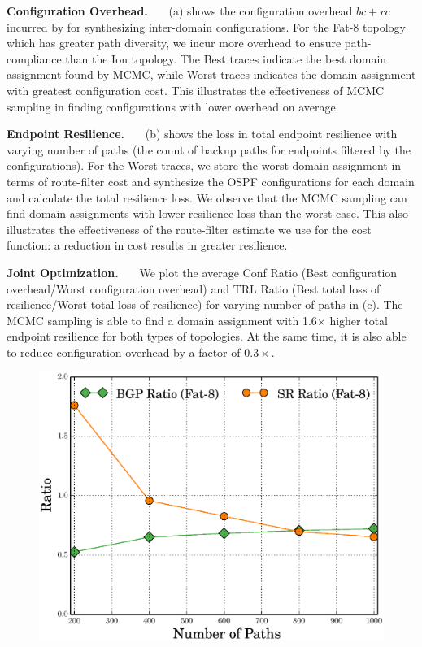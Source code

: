 \noindent\textbf{Configuration Overhead.}~~~
(a) shows the configuration overhead $bc + rc$ 
incurred by \name for synthesizing inter-domain configurations.
For the Fat-8 topology which has greater path diversity, we incur more 
overhead to ensure path-compliance than the Ion topology. 
The Best traces indicate the best domain assignment found by MCMC, while 
Worst traces indicates the domain assignment with greatest 
configuration cost. 
This illustrates
the effectiveness of MCMC sampling in finding configurations with lower overhead on average.

\noindent\textbf{Endpoint Resilience.}~~~ (b) shows
the loss in total endpoint resilience with varying number of paths
(the count of backup paths for endpoints filtered by the
configurations). For the Worst traces, we store the worst domain
assignment in terms of route-filter cost and synthesize the OSPF
configurations for each domain and calculate the total resilience
loss. We observe that the MCMC sampling can find domain assignments
with lower resilience loss than the worst case. This also illustrates
the effectiveness of the route-filter estimate we use for the cost
function: a reduction in cost results in greater resilience.

\noindent\textbf{Joint Optimization.}~~~
We plot the average Conf Ratio 
(Best configuration overhead/Worst configuration overhead) and TRL
Ratio (Best total loss of resilience/Worst total loss of resilience)
for varying number of paths in (c). The MCMC
sampling is able to find a domain assignment
with 1.6$\times$ higher total endpoint resilience for both types
of topologies. At the same time, it is also able to reduce configuration
overhead by a factor of $0.3\times$. 
\begin{figure}[!t]
	\centering
	{\includegraphics[width=0.33\columnwidth]{figures/ratioMCMC.eps}}
\end{figure}

